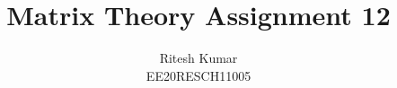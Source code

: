 \documentclass[journal,12pt,twocolumn]{IEEEtran}
\DeclareMathOperator*{\Res}{Res}
\begin{document}
	
	
	\newtheorem{theorem}{Theorem}[section]
	\newtheorem{problem}{Problem}
	\newtheorem{proposition}{Proposition}[section]
	\newtheorem{lemma}{Lemma}[section]
	\newtheorem{corollary}[theorem]{Corollary}
	\newtheorem{example}{Example}[section]
	\newtheorem{definition}[problem]{Definition}
	
	\newcommand{\BEQA}{\begin{eqnarray}}
	\newcommand{\EEQA}{\end{eqnarray}}
	\newcommand{\define}{\stackrel{\triangle}{=}}
	
	\providecommand{\mbf}{\mathbf}
	\providecommand{\pr}[1]{\ensuremath{\Pr\left(#1\right)}}
	\providecommand{\qfunc}[1]{\ensuremath{Q\left(#1\right)}}
	\providecommand{\sbrak}[1]{\ensuremath{{}\left[#1\right]}}
	\providecommand{\lsbrak}[1]{\ensuremath{{}\left[#1\right.}}
	\providecommand{\rsbrak}[1]{\ensuremath{{}\left.#1\right]}}
	\providecommand{\brak}[1]{\ensuremath{\left(#1\right)}}
	\providecommand{\lbrak}[1]{\ensuremath{\left(#1\right.}}
	\providecommand{\rbrak}[1]{\ensuremath{\left.#1\right)}}
	\providecommand{\cbrak}[1]{\ensuremath{\left\{#1\right\}}}
	\providecommand{\lcbrak}[1]{\ensuremath{\left\{#1\right.}}
	\providecommand{\rcbrak}[1]{\ensuremath{\left.#1\right\}}}
	\theoremstyle{remark}
	\newtheorem{rem}{Remark}
	\newcommand{\sgn}{\mathop{\mathrm{sgn}}}
	\providecommand{\abs}[1]{\left\vert#1\right\vert}
	\providecommand{\res}[1]{\Res\displaylimits_{#1}} 
	\providecommand{\norm}[1]{\left\lVert#1\right\rVert}
	\providecommand{\mtx}[1]{\mathbf{#1}}
	\providecommand{\mean}[1]{E\left[ #1 \right]}
	\providecommand{\fourier}{\overset{\mathcal{F}}{ \rightleftharpoons}}
	\providecommand{\system}{\overset{\mathcal{H}}{ \longleftrightarrow}}
	\newcommand{\solution}{\noindent \textbf{Solution: }}
	\newcommand{\cosec}{\,\text{cosec}\,}
	\providecommand{\dec}[2]{\ensuremath{\overset{#1}{\underset{#2}{\gtrless}}}}
	\newcommand{\myvec}[1]{\ensuremath{\begin{pmatrix}#1\end{pmatrix}}}
	\newcommand{\mydet}[1]{\ensuremath{\begin{vmatrix}#1\end{vmatrix}}}
	\makeatletter
	\makeatother
	\let\StandardTheFigure\thefigure
	\let\vec\mathbf
	\renewcommand{\thefigure}{\theproblem}
	\def\putbox#1#2#3{\makebox[0in][l]{\makebox[#1][l]{}\raisebox{\baselineskip}[0in][0in]{\raisebox{#2}[0in][0in]{#3}}}}
	\def\rightbox#1{\makebox[0in][r]{#1}}
	\def\centbox#1{\makebox[0in]{#1}}
	\def\topbox#1{\raisebox{-\baselineskip}[0in][0in]{#1}}
	\def\midbox#1{\raisebox{-0.5\baselineskip}[0in][0in]{#1}}
	\vspace{3cm}
	\title{Matrix Theory Assignment 12}
	\author{Ritesh Kumar \\ EE20RESCH11005}
	
\end{document}

